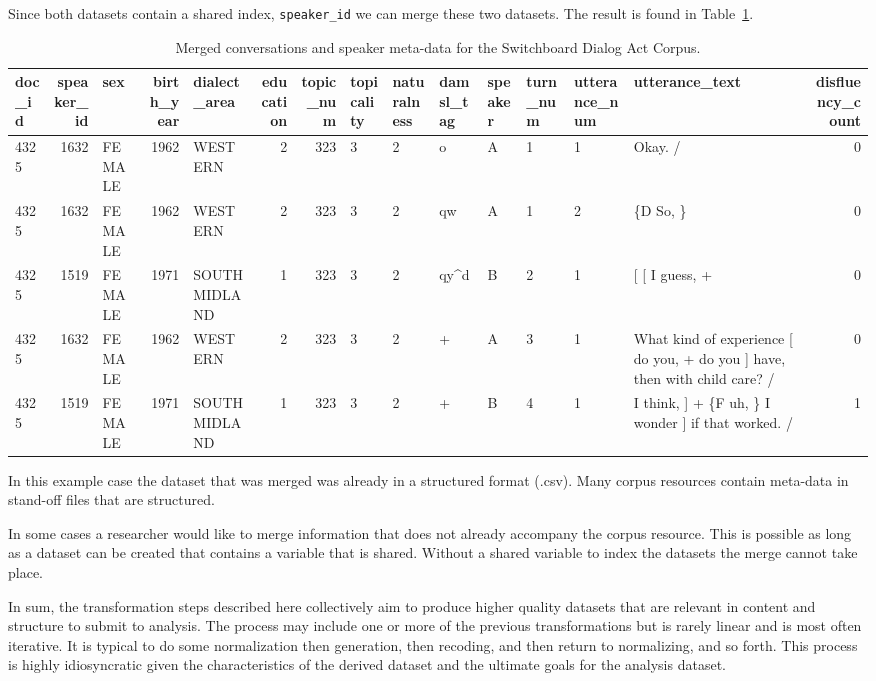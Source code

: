 \documentclass[
  letterpaper,
]{latex/krantz}
\begin{document}
Since both datasets contain a shared index, \texttt{speaker\_id} we can
merge these two datasets. The result is found in
Table~\ref{tbl-merging-swda-speaker-added}.

\hypertarget{tbl-merging-swda-speaker-added}{}
\begin{table}
\caption{\label{tbl-merging-swda-speaker-added}Merged conversations and speaker meta-data for the Switchboard Dialog
Act Corpus. }\tabularnewline

\centering
\begin{tabular}{lrlrlrrlllllllr}
\toprule
doc\_id & speaker\_id & sex & birth\_year & dialect\_area & education & topic\_num & topicality & naturalness & damsl\_tag & speaker & turn\_num & utterance\_num & utterance\_text & disfluency\_count\\
\midrule
4325 & 1632 & FEMALE & 1962 & WESTERN & 2 & 323 & 3 & 2 & o & A & 1 & 1 & Okay.  / & 0\\
4325 & 1632 & FEMALE & 1962 & WESTERN & 2 & 323 & 3 & 2 & qw & A & 1 & 2 & \{D So, \} & 0\\
4325 & 1519 & FEMALE & 1971 & SOUTH MIDLAND & 1 & 323 & 3 & 2 & qy\textasciicircum{}d & B & 2 & 1 & {}[ [ I guess, + & 0\\
4325 & 1632 & FEMALE & 1962 & WESTERN & 2 & 323 & 3 & 2 & + & A & 3 & 1 & What kind of experience [ do you, + do you ] have, then with child care? / & 0\\
4325 & 1519 & FEMALE & 1971 & SOUTH MIDLAND & 1 & 323 & 3 & 2 & + & B & 4 & 1 & I think, ] + \{F uh, \} I wonder ] if that worked. / & 1\\
\bottomrule
\end{tabular}
\end{table}

In this example case the dataset that was merged was already in a
structured format (.csv). Many corpus resources contain meta-data in
stand-off files that are structured.

In some cases a researcher would like to merge information that does not
already accompany the corpus resource. This is possible as long as a
dataset can be created that contains a variable that is shared. Without
a shared variable to index the datasets the merge cannot take place.

In sum, the transformation steps described here collectively aim to
produce higher quality datasets that are relevant in content and
structure to submit to analysis. The process may include one or more of
the previous transformations but is rarely linear and is most often
iterative. It is typical to do some normalization then generation, then
recoding, and then return to normalizing, and so forth. This process is
highly idiosyncratic given the characteristics of the derived dataset
and the ultimate goals for the analysis dataset.
\end{document}
